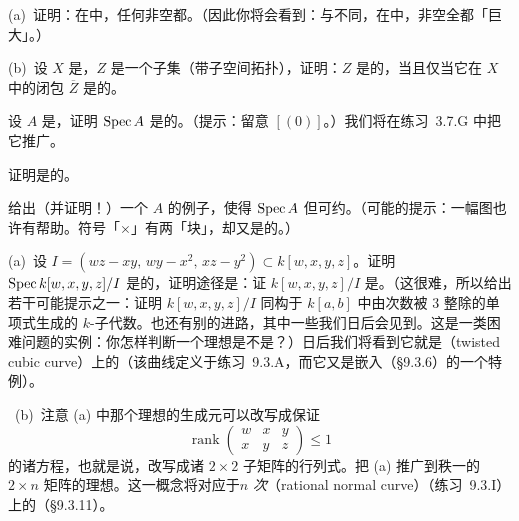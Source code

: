 \begin{exercise}[容易的练习]\label{ex:irreducible-open-dense}
(a)~证明：在\trIrreducible{}\trTopologicalSpace{}中，任何非空\trOpenSet{}都\trDense{}。（因此你将会看到：与\trClassicalTopology{}不同，在\trZariskiTopology{}中，非空\trOpenSet{}全都「巨大」。）

(b)~设 $X$ 是\trTopologicalSpace，$Z$ 是一个子集（带子空间拓扑），证明：$Z$ 是\trIrreducible{}的，当且仅当它在 $X$ 中的闭包 $\overline{Z}$ 是\trIrreducible{}的。
\end{exercise}

\begin{exercise}[容易的练习]\label{ex:integral-domain-irreducible}
设 $A$ 是\trIntegralDomain，证明 $\operatorname{Spec} A$ 是\trIrreducible{}的。（提示：留意\trGenericPoint{} $[(0)]$。）我们将在练习~3.7.G 中把它推广。
\end{exercise}

\begin{exercise}\label{ex:irreducible-connected}
证明\trIrreducible{}\trTopologicalSpace{}是\trConnected{}的。
\end{exercise}

\begin{exercise}\label{ex:connected-reducible-example}
给出（并证明！）一个\trRing{} $A$ 的例子，使得 $\operatorname{Spec} A$ \trConnected{}但可约。（可能的提示：一幅图也许有帮助。符号「$\times$」有两「块」，却又是\trConnected{}的。）
\end{exercise}

\begin{exercise}[棘手的练习]\label{ex:twisted-cubic-cone}
(a)~设 $I=(wz-xy,\,wy-x^2,\,xz-y^2)\subset k[w,x,y,z]$。证明 $\operatorname{Spec} k[w,x,y,z]/I$ 是\trIrreducible{}的，证明途径是：证 $k[w,x,y,z]/I$ 是\trIntegralDomain。（这很难，所以给出若干可能提示之一：证明 $k[w,x,y,z]/I$ 同构于 $k[a,b]$ 中由次数被 $3$ 整除的单项式生成的 $k$-子代数。也还有别的进路，其中一些我们日后会见到。这是一类困难问题的实例：你怎样判断一个理想是不是\trPrimeIdeal？）日后我们将看到它就是\emph{\trTwistedCubic{}}（twisted cubic curve）上的\trCone{}（该曲线定义于练习~9.3.A，而它又是\trVeronese{}嵌入（\S9.3.6）的一个特例）。

\hard\ (b)~注意 (a) 中那个理想的生成元可以改写成保证
\[
\operatorname{rank}\left(\begin{array}{ccc}
w & x & y \\
x & y & z
\end{array}\right)\le 1
\]
的诸方程，也就是说，改写成诸 $2\times 2$ 子矩阵的行列式。把 (a) 推广到秩一的 $2\times n$ 矩阵的理想。这一概念将对应于\emph{$n$ 次\trRationalNormalCurve{}}（rational normal curve）（练习~9.3.I）上的\trCone{}（\S9.3.11）。
\end{exercise}

